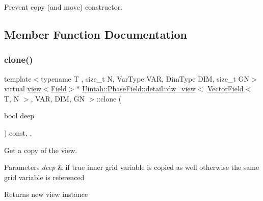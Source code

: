 Prevent copy (and move) constructor. 



\subsection{Member Function Documentation}
\mbox{\label{classUintah_1_1PhaseField_1_1detail_1_1dw__view_3_01VectorField_3_01T_00_01N_01_4_00_01VAR_00_01DIM_00_01GN_01_4_a3a7ade62eafad8e8db6d6072fb4ad38b}} 
\subsubsection{\texorpdfstring{clone()}{clone()}}
{\footnotesize\ttfamily template$<$typename T , size\+\_\+t N, Var\+Type V\+AR, Dim\+Type D\+IM, size\+\_\+t GN$>$ \\
virtual \hyperlink{classUintah_1_1PhaseField_1_1detail_1_1view}{view}$<$\hyperlink{structUintah_1_1PhaseField_1_1VectorField}{Field}$>$$\ast$ \hyperlink{classUintah_1_1PhaseField_1_1detail_1_1dw__view}{Uintah\+::\+Phase\+Field\+::detail\+::dw\+\_\+view}$<$ \hyperlink{structUintah_1_1PhaseField_1_1VectorField}{Vector\+Field}$<$ T, N $>$, V\+AR, D\+IM, GN $>$\+::clone (\begin{DoxyParamCaption}\item[{bool}]{deep }\end{DoxyParamCaption}) const\hspace{0.3cm}{\ttfamily [inline]}, {\ttfamily [override]}, {\ttfamily [virtual]}}



Get a copy of the view. 


\begin{DoxyParams}{Parameters}
{\em deep} & if true inner grid variable is copied as well otherwise the same grid variable is referenced\\
\hline
\end{DoxyParams}
\begin{DoxyReturn}{Returns}
new view instance 
\end{DoxyReturn}


